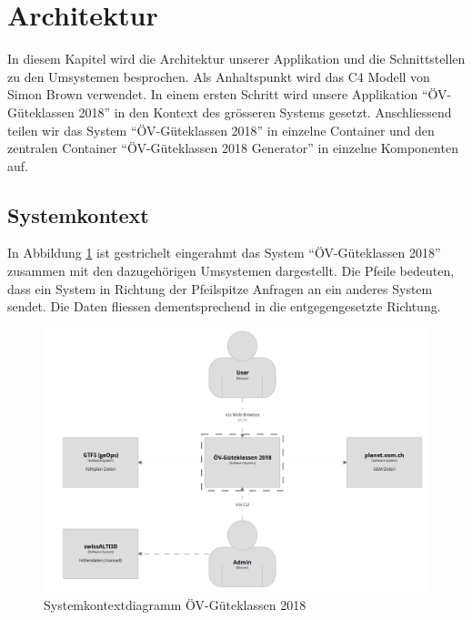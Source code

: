 
\section{Architektur}
\label{Architektur}

In diesem Kapitel wird die Architektur unserer Applikation und die Schnittstellen zu den Umsystemen besprochen.
Als Anhaltspunkt wird das C4 Modell \cite{c4model} von Simon Brown verwendet.
In einem ersten Schritt wird unsere Applikation "`ÖV-Güteklassen 2018"' in den Kontext des grösseren Systems gesetzt.
Anschliessend teilen wir das System "`ÖV-Güteklassen 2018"' in einzelne Container und den zentralen Container "`ÖV-Güteklassen 2018 Generator"' in einzelne Komponenten auf.

\subsection{Systemkontext}
\label{Architektur:Systemkontext}

In Abbildung \ref{fig:system-context-diagram} ist gestrichelt eingerahmt das System "`ÖV-Güteklassen 2018"' zusammen mit den dazugehörigen Umsystemen dargestellt.
Die Pfeile bedeuten, dass ein System in Richtung der Pfeilspitze Anfragen an ein anderes System sendet.
Die Daten fliessen dementsprechend in die entgegengesetzte Richtung.

\begin{figure}[ht]
    \centering
    \includegraphics[width=1\linewidth]{projectdoc/img/systemcontext-diagram.png}
    \caption[Systemkontextdiagramm]{Systemkontextdiagramm ÖV-Güteklassen 2018}
    \label{fig:system-context-diagram}
\end{figure}

